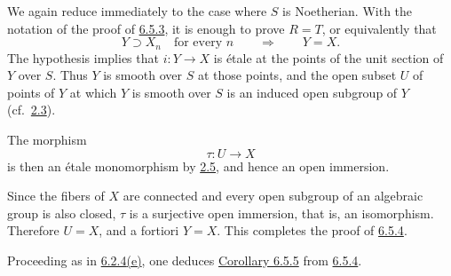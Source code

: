 We again reduce immediately to the case where \(S\) is
Noetherian. With the notation of the proof of \hyperref[cor:sga3-VIB-6.5.3]{6.5.3}, it is enough
to prove \(R=T\), or equivalently that
\[
  Y\supset X_n\quad\text{for every }n
  \qquad\Longrightarrow\qquad
  Y=X.
\]
The hypothesis implies that \(i:Y\to X\) is étale at the points
of the unit section of \(Y\) over \(S\). Thus \(Y\) is smooth
over \(S\) at those points, and the open subset \(U\) of points
of \(Y\) at which \(Y\) is smooth over \(S\) is an induced open
subgroup of \(Y\)
(cf.\ \hyperref[cor:sga3-VIB-2.3]{2.3}).
\begin{samepage}
The morphism
\[
  \tau:U\longrightarrow X
\]
is then an étale monomorphism by
\hyperref[prop:sga3-VIB-2.5]{2.5}, and hence an open immersion.
\end{samepage}
Since the fibers of \(X\) are connected and every open subgroup
of an algebraic group is also closed, \(\tau\) is a surjective
open immersion, that is, an isomorphism. Therefore \(U=X\), and
a fortiori \(Y=X\). This completes the proof of \hyperref[cor:sga3-VIB-6.5.4]{6.5.4}.

Proceeding as in
\hyperref[ex:sga3-VIB-6.2.4-e]{6.2.4\textup{(e)}}, one deduces
\hyperref[cor:sga3-VIB-6.5.5]{Corollary 6.5.5} from \hyperref[cor:sga3-VIB-6.5.4]{6.5.4}.
